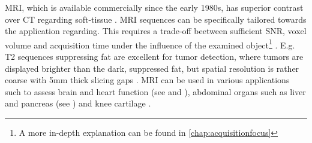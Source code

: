         \ac{MRI}, which is available commercially since the early 1980s, has superior contrast over CT regarding soft-tissue \citep{abramson2023surgeons, kabasawa2022mr}. \ac{MRI} sequences can be specifically tailored towards the application regarding. This requires a trade-off beetween sufficient \ac{SNR}, voxel volume and acquisition time under the influence of the examined object\footnote{A more in-depth explanation can be found in \ref{chap:acquisitionfocus}} \citep{macovski1996noise}. E.g. T2 sequences suppressing fat are excellent for tumor detection, where tumors are displayed brighter than the dark, suppressed fat, but spatial resolution is rather coarse with 5mm thick slicing gaps \citep{abramson2023surgeons}.
        \ac{MRI} can be used in various applications such to assess brain and heart function (see  and ), abdominal organs such as liver and pancreas (see ) and knee cartilage \citep{mazurowski2019deep}.









